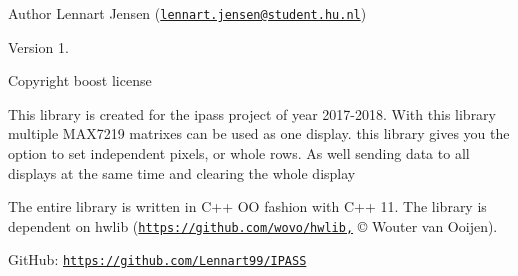 \begin{DoxyAuthor}{Author}
Lennart Jensen (\href{mailto:lennart.jensen@student.hu.nl}{\tt lennart.\+jensen@student.\+hu.\+nl}) 
\end{DoxyAuthor}
\begin{DoxyVersion}{Version}
1. 
\end{DoxyVersion}
\begin{DoxyCopyright}{Copyright}
boost license 


\end{DoxyCopyright}
This library is created for the ipass project of year 2017-\/2018. With this library multiple M\+A\+X7219 matrixes can be used as one display. this library gives you the option to set independent pixels, or whole rows. As well sending data to all displays at the same time and clearing the whole display

The entire library is written in C++ OO fashion with C++ 11. The library is dependent on hwlib (\href{https://github.com/wovo/hwlib,}{\tt https\+://github.\+com/wovo/hwlib,} © Wouter van Ooijen).

Git\+Hub\+: \href{https://github.com/Lennart99/IPASS}{\tt https\+://github.\+com/\+Lennart99/\+I\+P\+A\+SS} 